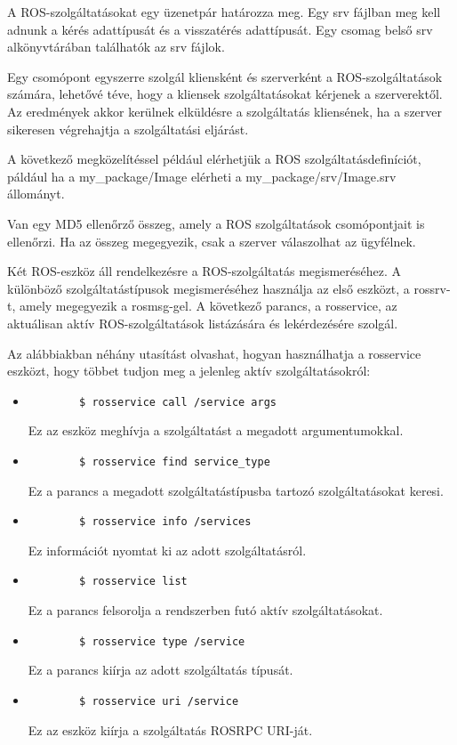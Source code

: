 \documentclass{article}
\begin{document}
A ROS-szolgáltatásokat egy üzenetpár határozza meg. Egy srv fájlban meg kell adnunk a kérés adattípusát és a visszatérés adattípusát. Egy csomag belső srv alkönyvtárában találhatók az srv fájlok.

Egy csomópont egyszerre szolgál kliensként és szerverként a ROS-szolgáltatások számára, lehetővé téve, hogy a kliensek szolgáltatásokat kérjenek a szerverektől. Az eredmények akkor kerülnek elküldésre a szolgáltatás kliensének, ha a szerver sikeresen végrehajtja a szolgáltatási eljárást.

A következő megközelítéssel például elérhetjük a ROS szolgáltatásdefiníciót, páldául ha a my\_package/Image elérheti a my\_package/srv/Image.srv állományt.

Van egy MD5 ellenőrző összeg, amely a ROS szolgáltatások csomópontjait is ellenőrzi. Ha az összeg megegyezik, csak a szerver válaszolhat az ügyfélnek.

Két ROS-eszköz áll rendelkezésre a ROS-szolgáltatás megismeréséhez. A különböző szolgáltatástípusok megismeréséhez használja az első eszközt, a rossrv-t, amely megegyezik a rosmsg-gel. A következő parancs, a rosservice, az aktuálisan aktív ROS-szolgáltatások listázására és lekérdezésére szolgál.

Az alábbiakban néhány utasítást olvashat, hogyan használhatja a rosservice eszközt, hogy többet tudjon meg a jelenleg aktív szolgáltatásokról:
\begin{itemize}
    \item
    \begin{verbatim}
        $ rosservice call /service args
    \end{verbatim}Ez az eszköz meghívja a szolgáltatást a megadott argumentumokkal.
    \item
    \begin{verbatim}
        $ rosservice find service_type
    \end{verbatim}Ez a parancs a megadott szolgáltatástípusba tartozó szolgáltatásokat keresi.
    \item
    \begin{verbatim}
        $ rosservice info /services
    \end{verbatim}Ez információt nyomtat ki az adott szolgáltatásról.
    \item
    \begin{verbatim}
        $ rosservice list
    \end{verbatim}Ez a parancs felsorolja a rendszerben futó aktív szolgáltatásokat.
    \item
    \begin{verbatim}
        $ rosservice type /service
    \end{verbatim}Ez a parancs kiírja az adott szolgáltatás típusát.
    \item
    \begin{verbatim}
        $ rosservice uri /service
    \end{verbatim}Ez az eszköz kiírja a szolgáltatás ROSRPC URI-ját.
\end{itemize}
\end{document}

